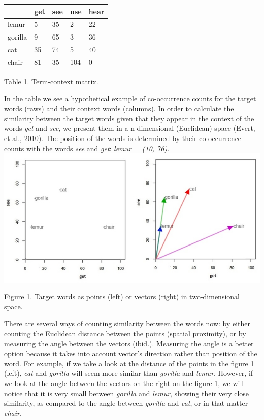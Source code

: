 \documentclass[11pt]{article}
\makeatletter
\def\maxwidth{\ifdim\Gin@nat@width>\linewidth\linewidth
    \else\Gin@nat@width\fi}
\let\Oldincludegraphics\includegraphics
\renewcommand{\includegraphics}[1]{\Oldincludegraphics[width=.8\maxwidth]{#1}}
\makeatother
\begin{document}
\begin{longtable}[]{@{}lllll@{}}
\toprule
& get & see & use & hear\tabularnewline
\midrule
\endhead
lemur & 5 & 35 & 2 & 22\tabularnewline
gorilla & 9 & 65 & 3 & 36\tabularnewline
cat & 35 & 74 & 5 & 40\tabularnewline
chair & 81 & 35 & 104 & 0\tabularnewline
\bottomrule
\end{longtable}

Table 1. Term-context matrix.

In the table we see a hypothetical example of co-occurrence counts for
the target words (raws) and their context words (columns). In order to
calculate the similarity between the target words given that they appear
in the context of the words \emph{get} and \emph{see}, we present them
in a n-dimensional (Euclidean) space (Evert, et al., 2010). The position
of the words is determined by their co-occurrence counts with the words
\emph{see} and \emph{get}: \emph{lemur = (10, 76)}.\\
\includegraphics{pics/figure1.jpg}

Figure 1. Target words as points (left) or vectors (right) in
two-dimensional space.

There are several ways of counting similarity between the words now: by
either counting the Euclidean distance between the points (spatial
proximity), or by measuring the angle between the vectors (ibid.).
Measuring the angle is a better option because it takes into account
vector's direction rather than position of the word. For example, if we
take a look at the distance of the points in the figure 1 (left),
\emph{cat} and \emph{gorilla} will seem more similar than \emph{gorilla}
and \emph{lemur}. However, if we look at the angle between the vectors
on the right on the figure 1, we will notice that it is very small
between \emph{gorilla} and \emph{lemur}, showing their very close
similarity, as compared to the angle between \emph{gorilla} and
\emph{cat}, or in that matter \emph{chair}.
\end{document}
